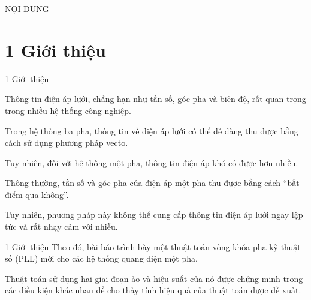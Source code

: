 \documentclass[11pt]{beamer}
\begin{document}
	\begin{frame}[t]{NỘI DUNG} \vspace{4pt}
		\Large{\tableofcontents}
		
	\end{frame}


\section{1 Giới thiệu}
	\begin{frame}[t]{1 Giới thiệu}	
		
		Thông tin điện áp lưới, chẳng hạn như tần số, góc pha và biên độ, rất quan trọng trong nhiều hệ thống công nghiệp.
		
		Trong hệ thống ba pha, thông tin về điện áp lưới có thể dễ dàng thu được bằng cách sử dụng phương pháp vecto.
		
		Tuy nhiên, đối với hệ thống một pha, thông tin điện áp khó có được hơn nhiều.
		
		Thông thường, tần số và góc pha của điện áp một pha thu được bằng cách “bắt điểm qua không”.
		
		Tuy nhiên, phương pháp này không thể cung cấp thông tin điện áp lưới ngay lập tức và rất nhạy cảm với nhiễu.
			
		
	\end{frame}

	\begin{frame}[t]{1 Giới thiệu}		
		Theo đó, bài báo trình bày một thuật toán vòng khóa pha kỹ thuật số (PLL) mới cho các hệ thống quang điện một pha. 
		
		Thuật toán sử dụng hai giai đoạn ảo và hiệu suất của nó được chứng minh trong các điều kiện khác nhau để cho thấy tính hiệu quả của thuật toán được đề xuất. 
		
	\end{frame}
\end{document}
